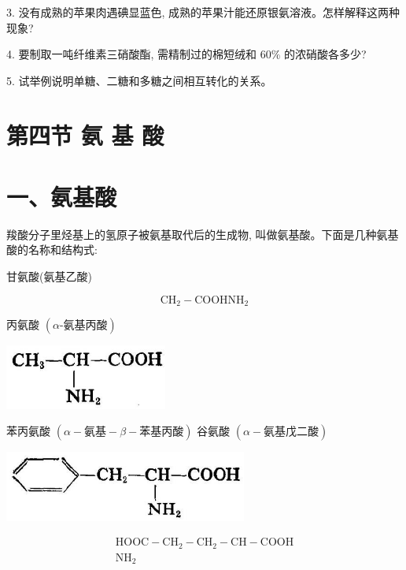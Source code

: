 \documentclass[10pt]{article}
\begin{document}
3. 没有成熟的苹果肉遇碘显蓝色, 成熟的苹果汁能还原银氨溶液。怎样解释这两种现象?

4. 要制取一吨纤维素三硝酸酯, 需精制过的棉短绒和 \({60}\%\) 的浓硝酸各多少?

5. 试举例说明单糖、二糖和多糖之间相互转化的关系。

\section*{第四节 氨 基 酸}

\section*{一、氨基酸}

羧酸分子里烃基上的氢原子被氨基取代后的生成物, 叫做氨基酸。下面是几种氨基酸的名称和结构式:

甘氨酸(氨基乙酸)

\[
{\mathrm{{CH}}}_{2} - \mathrm{{COOH}}{\mathrm{{NH}}}_{2}
\]

丙氨酸 \(\left( {\alpha \text{-氨基丙酸}}\right)\)

\begin{center}
\includegraphics[max width=0.4\textwidth]{images/01912d16-be99-77bb-9535-4f3ed8d9946f_170_893737.jpg}
\end{center}

苯丙氨酸 \(\left( {\alpha - \text{氨基} - \beta - \text{苯基丙酸}}\right)\) 谷氨酸 \(\left( {\alpha - \text{氨基戊二酸}}\right)\)

\begin{center}
\includegraphics[max width=0.6\textwidth]{images/01912d16-be99-77bb-9535-4f3ed8d9946f_171_857188.jpg}
\end{center}

\[
\begin{matrix} \mathrm{{HOOC}} - {\mathrm{{CH}}}_{2} - {\mathrm{{CH}}}_{2} - \mathrm{{CH}} - \mathrm{{COOH}} \\ \mathrm{N}{\mathrm{H}}_{2} \end{matrix}
\]
\end{document}
